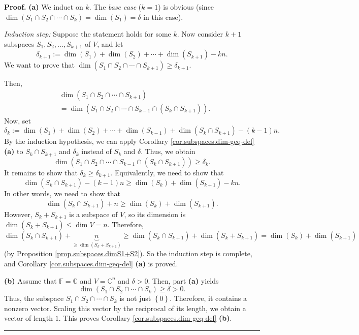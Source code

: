 \documentclass[numbers=enddot,12pt,final,onecolumn,notitlepage]{scrartcl}%
\numberwithin{exer}{subsection}
\theoremstyle{definition}
\newenvironment{proof}[1][Proof]{\noindent\textbf{#1.} }{\ \rule{0.5em}{0.5em}}
\begin{document}
\begin{proof}
\textbf{(a)} We induct on $k$. The \textit{base case} ($k=1$) is obvious
(since $\dim\left(  S_{1}\cap S_{2}\cap\cdots\cap S_{k}\right)  =\dim\left(
S_{1}\right)  =\delta$ in this case).

\textit{Induction step:} Suppose the statement holds for some $k$. Now
consider $k+1$ subspaces $S_{1},S_{2},\ldots,S_{k+1}$ of $V$, and let%
\[
\delta_{k+1}:=\dim\left(  S_{1}\right)  +\dim\left(  S_{2}\right)
+\cdots+\dim\left(  S_{k+1}\right)  -kn.
\]
We want to prove that $\dim\left(  S_{1}\cap S_{2}\cap\cdots\cap
S_{k+1}\right)  \geq\delta_{k+1}$.

Then,%
\begin{align*}
&  \dim\left(  S_{1}\cap S_{2}\cap\cdots\cap S_{k+1}\right) \\
&  =\dim\left(  S_{1}\cap S_{2}\cap\cdots\cap S_{k-1}\cap\left(  S_{k}\cap
S_{k+1}\right)  \right)  .
\end{align*}
Now, set
\[
\delta_{k}:=\dim\left(  S_{1}\right)  +\dim\left(  S_{2}\right)  +\cdots
+\dim\left(  S_{k-1}\right)  +\dim\left(  S_{k}\cap S_{k+1}\right)  -\left(
k-1\right)  n.
\]
By the induction hypothesis, we can apply Corollary
\ref{cor.subspaces.dim-geq-del} \textbf{(a)} to $S_{k}\cap S_{k+1}$ and
$\delta_{k}$ instead of $S_{k}$ and $\delta$. Thus, we obtain%
\[
\dim\left(  S_{1}\cap S_{2}\cap\cdots\cap S_{k-1}\cap\left(  S_{k}\cap
S_{k+1}\right)  \right)  \geq\delta_{k}.
\]
It remains to show that $\delta_{k}\geq\delta_{k+1}$. Equivalently, we need to
show that%
\[
\dim\left(  S_{k}\cap S_{k+1}\right)  -\left(  k-1\right)  n\geq\dim\left(
S_{k}\right)  +\dim\left(  S_{k+1}\right)  -kn.
\]
In other words, we need to show that%
\[
\dim\left(  S_{k}\cap S_{k+1}\right)  +n\geq\dim\left(  S_{k}\right)
+\dim\left(  S_{k+1}\right)  .
\]
However, $S_{k}+S_{k+1}$ is a subspace of $V$, so its dimension is
$\dim\left(  S_{k}+S_{k+1}\right)  \leq\dim V=n$. Therefore,
\[
\dim\left(  S_{k}\cap S_{k+1}\right)  +\underbrace{n}_{\geq\dim\left(
S_{k}+S_{k+1}\right)  }\geq\dim\left(  S_{k}\cap S_{k+1}\right)  +\dim\left(
S_{k}+S_{k+1}\right)  =\dim\left(  S_{k}\right)  +\dim\left(  S_{k+1}\right)
\]
(by Proposition \ref{prop.subspaces.dimS1+S2}). So the induction step is
complete, and Corollary \ref{cor.subspaces.dim-geq-del} \textbf{(a)} is
proved. \medskip

\textbf{(b)} Assume that $\mathbb{F}=\mathbb{C}$ and $V=\mathbb{C}^{n}$ and
$\delta>0$. Then, part \textbf{(a)} yields%
\[
\dim\left(  S_{1}\cap S_{2}\cap\cdots\cap S_{k}\right)  \geq\delta>0.
\]
Thus, the subspace $S_{1}\cap S_{2}\cap\cdots\cap S_{k}$ is not just $\left\{
0\right\}  $. Therefore, it contains a nonzero vector. Scaling this vector by
the reciprocal of its length, we obtain a vector of length $1$. This proves
Corollary \ref{cor.subspaces.dim-geq-del} \textbf{(b)}.
\end{proof}
\end{document}

